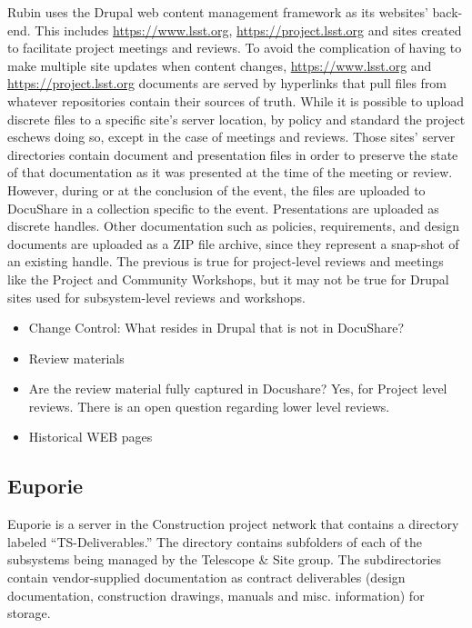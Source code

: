 Rubin uses the Drupal web content management framework as its websites’ back-end.
This includes \url{https://www.lsst.org}, \url{https://project.lsst.org} and sites created to facilitate project meetings and reviews.
To avoid the complication of having to make multiple site updates when content changes, \url{https://www.lsst.org} and \url{https://project.lsst.org} documents are served by hyperlinks that pull files from whatever repositories contain their sources of truth.
While it is possible to upload discrete files to a specific site’s server location, by policy and standard the project eschews doing so, except in the case of meetings and reviews.
Those sites’ server directories contain document and presentation files in order to preserve the state of that documentation as it was presented at the time of the meeting or review.
However, during or at the conclusion of the event, the files are uploaded to DocuShare in a collection specific to the event.
Presentations are uploaded as discrete handles.
Other documentation such as policies, requirements, and design documents are uploaded as a ZIP file archive, since they represent a snap-shot of an existing handle.
The previous is true for project-level reviews and meetings like the Project and Community Workshops, but it may not be true for Drupal sites used for subsystem-level reviews and workshops.

\begin{itemize}
	\item Change Control: What resides in Drupal that is not in DocuShare?
	\item Review materials
	\item Are the review material fully captured in Docushare? Yes, for Project level reviews. There is an open question regarding lower level reviews.
	\item Historical WEB pages
\end{itemize}

\subsection{Euporie}

Euporie is a server in the Construction project network that contains a directory labeled ``TS-Deliverables.''
The directory contains subfolders of each of the subsystems being managed by the Telescope \& Site group.
The subdirectories contain vendor-supplied documentation as contract deliverables (design documentation, construction drawings, manuals and misc. information) for storage.

